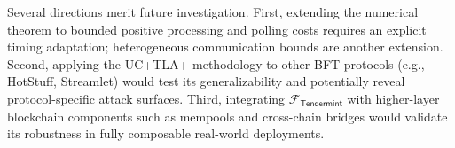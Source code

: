 \documentclass[conference,letterpaper,10pt]{IEEEtran}
\begin{document}
Several directions merit future investigation. First, extending the numerical theorem to bounded positive processing and polling costs requires an explicit timing adaptation; heterogeneous communication bounds are another extension. Second, applying the UC+TLA+ methodology to other BFT protocols (e.g., HotStuff, Streamlet) would test its generalizability and potentially reveal protocol-specific attack surfaces. Third, integrating $\mathcal{F}_{\scriptscriptstyle \mathsf{Tendermint}}$ with higher-layer blockchain components such as mempools and cross-chain bridges would validate its robustness in fully composable real-world deployments.

\clearpage


\end{document}
